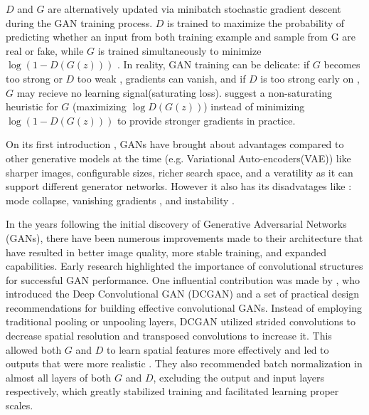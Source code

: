 $D$ and $G$ are alternatively updated via minibatch stochastic gradient descent during the GAN training process. 
$D$ is trained to maximize the probability of predicting whether an input from both training example and sample from G are real or fake,
while $G$ is trained simultaneously to minimize $\log(1-D(G(z)))$ \citep{GAN}. 
In reality, GAN training can be delicate: if $G$ becomes too strong or $D$ too weak , gradients can vanish, and if $D$ is too strong early on , $G$ may recieve no learning signal(saturating loss).
\citet{GAN}  suggest a non-saturating heuristic for $G$ (maximizing $\log D(G(z))$) instead of minimizing $\log(1-D(G(z)))$ to provide stronger gradients in practice. 

On its first introduction , GANs have brought about advantages compared to other generative models at the time (e.g. Variational Auto-encoders(VAE))
like sharper images, configurable sizes, richer search space, and a veratility as it can support different generator networks.
However it also has its disadvatages like : mode collapse, vanishing gradients , and instability \citep{cohen2022generativeadversarialnetworks}.

In the years following the initial discovery of Generative Adversarial Networks (GANs), there have been numerous improvements made to their architecture that have resulted in better image quality, more stable training, and expanded capabilities. Early research highlighted the importance of convolutional structures for successful GAN performance. One influential contribution was made by \citet{richardson2021encodingstylestyleganencoder}, who introduced the Deep Convolutional GAN (DCGAN) and a set of practical design recommendations for building effective convolutional GANs. Instead of employing traditional pooling or unpooling layers, DCGAN utilized strided convolutions to decrease spatial resolution and transposed convolutions to increase it. This allowed both $G$ and $D$ to learn spatial features more effectively and led to outputs that were more realistic \citep{goodfellow2017nips2016tutorialgenerative}. They also recommended batch normalization in almost all layers of both $G$ and $D$, excluding the output and input layers respectively, which greatly stabilized training and facilitated learning proper scales. 

